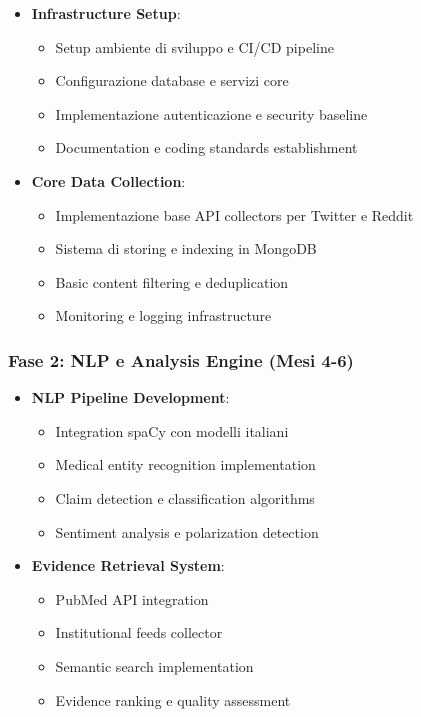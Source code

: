\documentclass[12pt,a4paper]{report}
\begin{document}
\begin{itemize}
    \item \textbf{Infrastructure Setup}:
    \begin{itemize}
        \item Setup ambiente di sviluppo e CI/CD pipeline
        \item Configurazione database e servizi core
        \item Implementazione autenticazione e security baseline
        \item Documentation e coding standards establishment
    \end{itemize}
    
    \item \textbf{Core Data Collection}:
    \begin{itemize}
        \item Implementazione base API collectors per Twitter e Reddit
        \item Sistema di storing e indexing in MongoDB
        \item Basic content filtering e deduplication
        \item Monitoring e logging infrastructure
    \end{itemize}
\end{itemize}

\subsubsection{Fase 2: NLP e Analysis Engine (Mesi 4-6)}

\begin{itemize}
    \item \textbf{NLP Pipeline Development}:
    \begin{itemize}
        \item Integration spaCy con modelli italiani
        \item Medical entity recognition implementation
        \item Claim detection e classification algorithms
        \item Sentiment analysis e polarization detection
    \end{itemize}
    
    \item \textbf{Evidence Retrieval System}:
    \begin{itemize}
        \item PubMed API integration
        \item Institutional feeds collector
        \item Semantic search implementation
        \item Evidence ranking e quality assessment
    \end{itemize}
\end{itemize}
\end{document}
